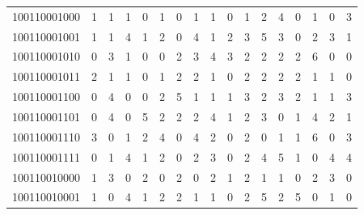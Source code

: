 \documentclass[10pt,a4paper]{article}
\begin{document}
\begin{longtable}{ |c|c|c|c|c|c|c|c|c|c|c|c|c|c|c|c|c| }
    100110001000              & 1                            & 1                                & 1                            & 0                              & 1   & 0   & 1   & 1   & 0   & 1   & 2   & 4   & 0   & 1   & 0   & 3   \\
    100110001001              & 1                            & 1                                & 4                            & 1                              & 2   & 0   & 4   & 1   & 2   & 3   & 5   & 3   & 0   & 2   & 3   & 1   \\
    100110001010              & 0                            & 3                                & 1                            & 0                              & 0   & 2   & 3   & 4   & 3   & 2   & 2   & 2   & 2   & 6   & 0   & 0   \\
    100110001011              & 2                            & 1                                & 1                            & 0                              & 1   & 2   & 2   & 1   & 0   & 2   & 2   & 2   & 2   & 1   & 1   & 0   \\
    100110001100              & 0                            & 4                                & 0                            & 0                              & 2   & 5   & 1   & 1   & 1   & 3   & 2   & 3   & 2   & 1   & 1   & 3   \\
    100110001101              & 0                            & 4                                & 0                            & 5                              & 2   & 2   & 2   & 4   & 1   & 2   & 3   & 0   & 1   & 4   & 2   & 1   \\
    100110001110              & 3                            & 0                                & 1                            & 2                              & 4   & 0   & 4   & 2   & 0   & 2   & 0   & 1   & 1   & 6   & 0   & 3   \\
    100110001111              & 0                            & 1                                & 4                            & 1                              & 2   & 0   & 2   & 3   & 0   & 2   & 4   & 5   & 1   & 0   & 4   & 4   \\
    100110010000              & 1                            & 3                                & 0                            & 2                              & 0   & 2   & 0   & 2   & 1   & 2   & 1   & 1   & 0   & 2   & 3   & 0   \\
    100110010001              & 1                            & 0                                & 4                            & 1                              & 2   & 2   & 1   & 1   & 0   & 2   & 5   & 2   & 5   & 0   & 1   & 0   \\

\end{longtable}
\end{document}
